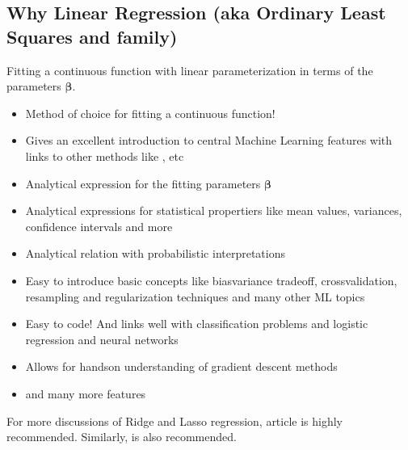 \documentclass[letterpaper,10pt,english]{sphinxmanual}
\begin{document}
\subsection{Why Linear Regression (aka Ordinary Least Squares and family)}
\label{\detokenize{chapter4:why-linear-regression-aka-ordinary-least-squares-and-family}}
Fitting a continuous function with linear parameterization in terms of the parameters  \(\boldsymbol{\beta}\).
\begin{itemize}
\item {} 
Method of choice for fitting a continuous function!

\item {} 
Gives an excellent introduction to central Machine Learning features with  links to other methods like ,  etc

\item {} 
Analytical expression for the fitting parameters \(\boldsymbol{\beta}\)

\item {} 
Analytical expressions for statistical propertiers like mean values, variances, confidence intervals and more

\item {} 
Analytical relation with probabilistic interpretations

\item {} 
Easy to introduce basic concepts like bias\sphinxhyphen{}variance tradeoff, cross\sphinxhyphen{}validation, resampling and regularization techniques and many other ML topics

\item {} 
Easy to code! And links well with classification problems and logistic regression and neural networks

\item {} 
Allows for  hands\sphinxhyphen{}on understanding of gradient descent methods

\item {} 
and many more features

\end{itemize}

For more discussions of Ridge and Lasso regression,  article is highly recommended.
Similarly,  is also recommended.
\end{document}
